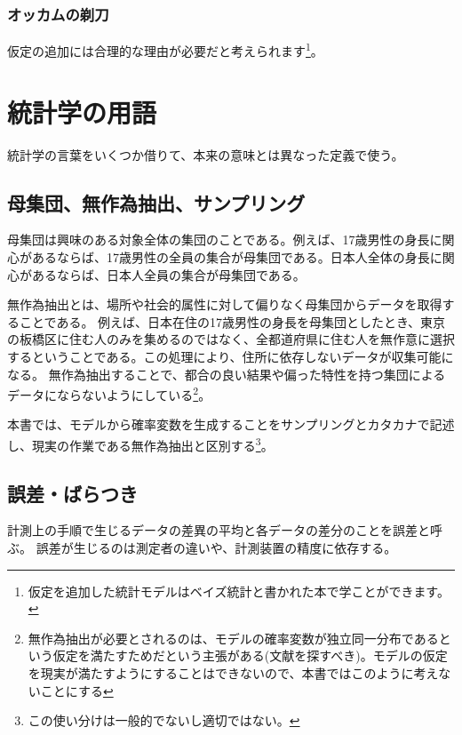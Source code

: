 \subsubsection{オッカムの剃刀}

仮定の追加には合理的な理由が必要だと考えられます\footnote{仮定を追加した統計モデルはベイズ統計と書かれた本で学ことができます。}。

\begin{figure}
    \begin{center}
%
\end{center}
\end{figure}
\fi


\section{統計学の用語}
統計学の言葉をいくつか借りて、本来の意味とは異なった定義で使う。


\subsection{母集団、無作為抽出、サンプリング}
母集団は興味のある対象全体の集団のことである。例えば、17歳男性の身長に関心があるならば、17歳男性の全員の集合が母集団である。日本人全体の身長に関心があるならば、日本人全員の集合が母集団である。

無作為抽出とは、場所や社会的属性に対して偏りなく母集団からデータを取得することである。
例えば、日本在住の17歳男性の身長を母集団としたとき、東京の板橋区に住む人のみを集めるのではなく、全都道府県に住む人を無作意に選択するということである。この処理により、住所に依存しないデータが収集可能になる。
無作為抽出することで、都合の良い結果や偏った特性を持つ集団によるデータにならないようにしている\footnote{無作為抽出が必要とされるのは、モデルの確率変数が独立同一分布であるという仮定を満たすためだという主張がある(文献を探すべき)。モデルの仮定を現実が満たすようにすることはできないので、本書ではこのように考えないことにする}。


本書では、モデルから確率変数を生成することをサンプリングとカタカナで記述し、現実の作業である無作為抽出と区別する\footnote{この使い分けは一般的でないし適切ではない。}。

\subsection{誤差・ばらつき}
計測上の手順で生じるデータの差異の平均と各データの差分のことを誤差と呼ぶ。
誤差が生じるのは測定者の違いや、計測装置の精度に依存する。

